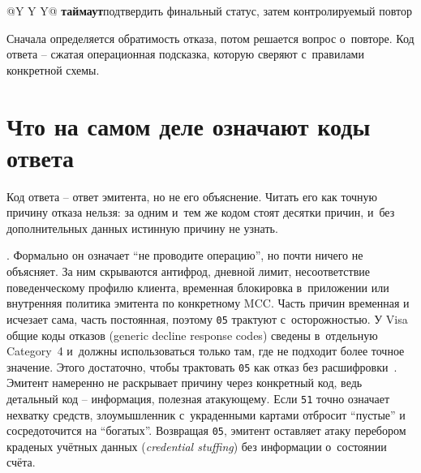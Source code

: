 \begin{table}[H]
\begin{minipage}{\textwidth}
\begin{tabularx}{\textwidth}{@{}Y Y Y@{}}
      \newline\textbf{таймаут}\newline подтвердить финальный статус,
      затем контролируемый повтор \\
      \bottomrule
    \end{tabularx}
    \par\smallskip
  \end{minipage}%
  \endgroup
  \caption{Рабочая классификация кодов ответа по следующему действию.}\label{fig:decline-codes}
\end{table}

Сначала определяется обратимость отказа, потом решается вопрос
о~повторе. Код ответа -- сжатая операционная подсказка, которую сверяют
с~правилами конкретной схемы.

\section{Что на самом деле означают коды ответа}\label{sec:decline-response-codes}

Код ответа -- ответ эмитента, но не его объяснение. Читать его как точную
причину отказа нельзя: за одним и~тем же кодом стоят десятки причин, и~без
дополнительных данных истинную причину не узнать.

. Формально он означает \enquote{не проводите операцию}, но почти ничего не
объясняет. За ним скрываются антифрод, дневной лимит, несоответствие
поведенческому профилю клиента, временная блокировка в~приложении или
внутренняя политика эмитента по конкретному MCC. Часть причин
временная и исчезает сама, часть постоянная, поэтому
\texttt{05} трактуют с~осторожностью. У Visa общие коды отказов (generic decline
response codes) сведены в~отдельную Category~4 и~должны использоваться
только там, где не подходит более точное значение. Этого достаточно,
чтобы трактовать \texttt{05} как отказ без расшифровки~\cite{visa-core-rules}.
Эмитент намеренно не раскрывает причину через конкретный код, ведь
детальный код -- информация, полезная атакующему. Если \texttt{51} точно
означает нехватку средств, злоумышленник с~украденными картами отбросит
\enquote{пустые} и сосредоточится на \enquote{богатых}. Возвращая \texttt{05},
эмитент оставляет атаку перебором краденых учётных данных (\textit{credential stuffing}) без информации о~состоянии счёта.

